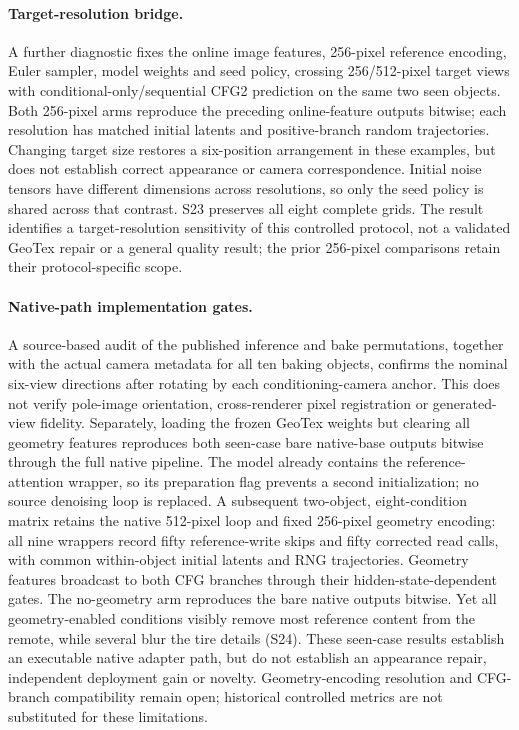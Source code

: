 \paragraph{Target-resolution bridge.}
A further diagnostic fixes the online image features, 256-pixel reference encoding, Euler sampler, model weights and seed policy, crossing 256/512-pixel target views with conditional-only/sequential CFG2 prediction on the same two seen objects. Both 256-pixel arms reproduce the preceding online-feature outputs bitwise; each resolution has matched initial latents and positive-branch random trajectories. Changing target size restores a six-position arrangement in these examples, but does not establish correct appearance or camera correspondence. Initial noise tensors have different dimensions across resolutions, so only the seed policy is shared across that contrast. S23 preserves all eight complete grids. The result identifies a target-resolution sensitivity of this controlled protocol, not a validated GeoTex repair or a general quality result; the prior 256-pixel comparisons retain their protocol-specific scope.

\paragraph{Native-path implementation gates.}
A source-based audit of the published inference and bake permutations, together with the actual camera metadata for all ten baking objects, confirms the nominal six-view directions after rotating by each conditioning-camera anchor. This does not verify pole-image orientation, cross-renderer pixel registration or generated-view fidelity. Separately, loading the frozen GeoTex weights but clearing all geometry features reproduces both seen-case bare native-base outputs bitwise through the full native pipeline. The model already contains the reference-attention wrapper, so its preparation flag prevents a second initialization; no source denoising loop is replaced. A subsequent two-object, eight-condition matrix retains the native 512-pixel loop and fixed 256-pixel geometry encoding: all nine wrappers record fifty reference-write skips and fifty corrected read calls, with common within-object initial latents and RNG trajectories. Geometry features broadcast to both CFG branches through their hidden-state-dependent gates. The no-geometry arm reproduces the bare native outputs bitwise. Yet all geometry-enabled conditions visibly remove most reference content from the remote, while several blur the tire details (S24). These seen-case results establish an executable native adapter path, but do not establish an appearance repair, independent deployment gain or novelty. Geometry-encoding resolution and CFG-branch compatibility remain open; historical controlled metrics are not substituted for these limitations.


